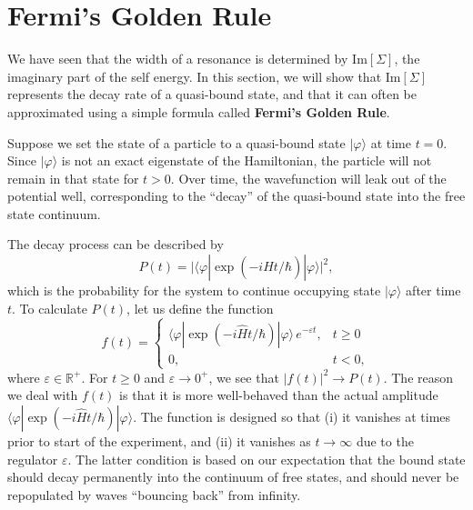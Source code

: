 \documentclass[pra,12pt]{revtex4}
\begin{document}
\section{Fermi's Golden Rule}
\label{sec:goldenrule}

We have seen that the width of a resonance is determined by
$\mathrm{Im}[\Sigma]$, the imaginary part of the self energy.  In this
section, we will show that $\mathrm{Im}[\Sigma]$ represents the decay
rate of a quasi-bound state, and that it can often be approximated
using a simple formula called \textbf{Fermi's Golden Rule}.

Suppose we set the state of a particle to a quasi-bound state
$|\varphi\rangle$ at time $t = 0$.  Since $|\varphi\rangle$ is not an
exact eigenstate of the Hamiltonian, the particle will not remain in
that state for $t > 0$.  Over time, the wavefunction will leak out of
the potential well, corresponding to the ``decay'' of the quasi-bound
state into the free state continuum.

The decay process can be described by
\begin{equation}
  P(t) = \Big|\langle\varphi|\exp\left(-i\hat{H}t/\hbar\right)|\varphi\rangle\Big|^2,
\end{equation}
which is the probability for the system to continue occupying state
$|\varphi\rangle$ after time $t$.  To calculate $P(t)$, let us define
the function
\begin{equation}
  f(t) = \begin{cases} \langle\varphi|\exp\left(-i\hat{H}t/\hbar\right)|\varphi\rangle \,e^{-\varepsilon t}, & t \ge 0 \\ 0, & t < 0,\end{cases}
  \label{fregulated}
\end{equation}
where $\varepsilon \in \mathbb{R}^+$.  For $t \ge 0$ and $\varepsilon
\rightarrow 0^+$, we see that $|f(t)|^2 \rightarrow P(t)$.  The reason
we deal with $f(t)$ is that it is more well-behaved than the actual
amplitude $\langle\varphi|\exp(-i\hat{H}t/\hbar)|\varphi\rangle$.  The
function is designed so that (i) it vanishes at times prior to start
of the experiment, and (ii) it vanishes as $t\rightarrow\infty$ due to
the regulator $\varepsilon$.  The latter condition is based on our
expectation that the bound state should decay permanently into the
continuum of free states, and should never be repopulated by waves
``bouncing back'' from infinity.
\end{document}
